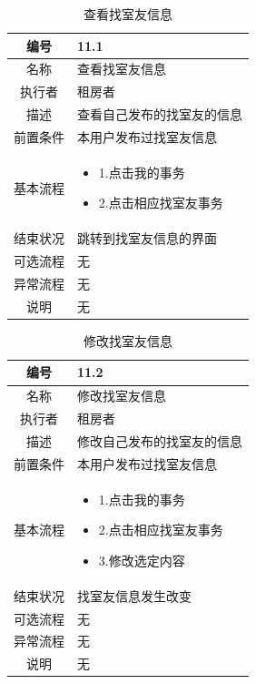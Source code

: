 \begin{table}[htbp]
	\centering
	\begin{tabular}{|c|p{11cm}|}
        \hline
        编号 & 11.1 \\
        \hline
        名称 & 查看找室友信息 \\ 
        \hline
        执行者 & 租房者 \\
        \hline
        描述 & 查看自己发布的找室友的信息 \\
        \hline
        前置条件 & 本用户发布过找室友信息 \\
        \hline
        基本流程 & \begin{itemize}
            \item 1.点击我的事务
            \item 2.点击相应找室友事务
 
        \end{itemize} \\
        \hline
        结束状况 &跳转到找室友信息的界面 \\
        \hline
        可选流程 & 无 \\
        \hline
        异常流程 & 无 \\
        \hline
        说明 & 无 \\
        \hline
    \end{tabular}
    \caption{查看找室友信息}
\end{table}

\begin{table}[htbp]
	\centering
	\begin{tabular}{|c|p{11cm}|}
        \hline
        编号 & 11.2 \\
        \hline
        名称 & 修改找室友信息 \\ 
        \hline
        执行者 & 租房者 \\
        \hline
        描述 & 修改自己发布的找室友的信息\\
        \hline
        前置条件 & 本用户发布过找室友信息 \\
        \hline
        基本流程 & \begin{itemize}
            \item 1.点击我的事务
            \item 2.点击相应找室友事务
            \item 3.修改选定内容
        \end{itemize} \\
        \hline
        结束状况 &找室友信息发生改变 \\
        \hline
        可选流程 & 无 \\
        \hline
        异常流程 & 无 \\
        \hline
        说明 & 无 \\
        \hline
    \end{tabular}
    \caption{修改找室友信息}
\end{table}

